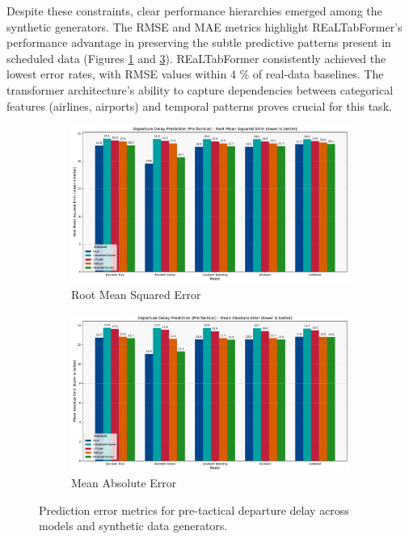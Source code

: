 \documentclass[conference]{IEEEtran}
\begin{document}
Despite these constraints, clear performance hierarchies emerged among the synthetic generators. The RMSE and MAE metrics highlight REaLTabFormer's performance advantage in preserving the subtle predictive patterns present in scheduled data (Figures \ref{fig:departure_pre_rmse} and \ref{fig:departure_pre_mae}). REaLTabFormer consistently achieved the lowest error rates, with RMSE values within 4 \% of real-data baselines. The transformer architecture's ability to capture dependencies between categorical features (airlines, airports) and temporal patterns proves crucial for this task.

\begin{figure}[htbp]
    \centering
    \begin{subfigure}[b]{0.49\textwidth}
        \includegraphics[width=\linewidth]{plots/departure_delay_min_pre-tactical/departure_delay_min_pre-tactical_rmse.pdf}
        \caption{Root Mean Squared Error}
        \label{fig:departure_pre_rmse}
    \end{subfigure}
    \hfill
    \begin{subfigure}[b]{0.49\textwidth}
        \includegraphics[width=\linewidth]{plots/departure_delay_min_pre-tactical/departure_delay_min_pre-tactical_mae.pdf}
        \caption{Mean Absolute Error}
        \label{fig:departure_pre_mae}
    \end{subfigure}
    \caption{Prediction error metrics for pre-tactical departure delay across models and synthetic data generators.}
\end{figure}
\end{document}
